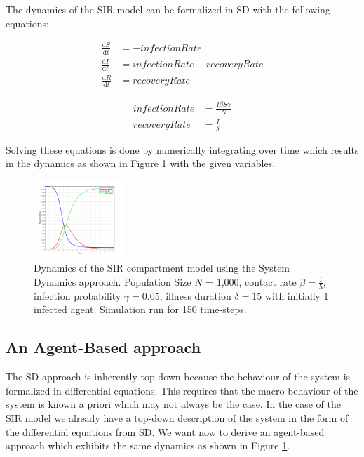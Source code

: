 The dynamics of the SIR model can be formalized in SD with the following equations:

\begin{align}
\frac{\mathrm d S}{\mathrm d t} &= -infectionRate \\ 
\frac{\mathrm d I}{\mathrm d t} &= infectionRate - recoveryRate \\ 
\frac{\mathrm d R}{\mathrm d t} &= recoveryRate 
\end{align}

\begin{align}
infectionRate &= \frac{I \beta S \gamma}{N} \\
recoveryRate &= \frac{I}{\delta} 
\end{align}

Solving these equations is done by numerically integrating over time which results in the dynamics as shown in Figure \ref{fig:sir_sd_dynamics} with the given variables.

\begin{figure}
	\centering
	\includegraphics[width=0.3\textwidth, angle=0]{./fig/step3_dataflow/SIR_SD_1000agents_150t_001dt.png}
	\caption{Dynamics of the SIR compartment model using the System Dynamics approach. Population Size $N$ = 1,000, contact rate $\beta =  \frac{1}{5}$, infection probability $\gamma = 0.05$, illness duration $\delta = 15$ with initially 1 infected agent. Simulation run for 150 time-steps.}
	\label{fig:sir_sd_dynamics}
\end{figure}

\subsection*{An Agent-Based approach}
The SD approach is inherently top-down because the behaviour of the system is formalized in differential equations. This requires that the macro behaviour of the system is known a priori which may not always be the case. In the case of the SIR model we already have a top-down description of the system in the form of the differential equations from SD. We want now to derive an agent-based approach which exhibits the same dynamics as shown in Figure \ref{fig:sir_sd_dynamics}.

